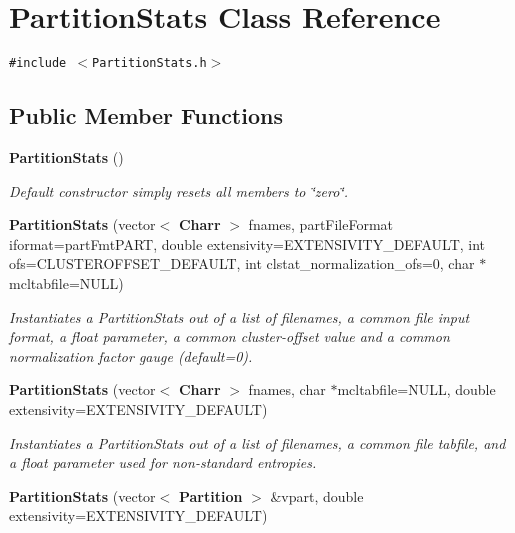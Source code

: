 \section{Partition\-Stats Class Reference}
\label{classPartitionStats}
{\tt \#include $<$Partition\-Stats.h$>$}

\subsection*{Public Member Functions}
\begin{CompactItemize}
\item 
{\bf Partition\-Stats} ()\label{classPartitionStats_a0}

\begin{CompactList}\small\item\em Default constructor simply resets all members to \char`\"{}zero\char`\"{}. \item\end{CompactList}\item 
{\bf Partition\-Stats} (vector$<$ {\bf Charr} $>$ fnames, part\-File\-Format iformat=part\-Fmt\-PART, double extensivity=EXTENSIVITY\_\-DEFAULT, int ofs=CLUSTEROFFSET\_\-DEFAULT, int clstat\_\-normalization\_\-ofs=0, char $\ast$mcltabfile=NULL)\label{classPartitionStats_a1}

\begin{CompactList}\small\item\em Instantiates a Partition\-Stats out of a list of filenames, a common file input format, a float parameter, a common cluster-offset value and a common normalization factor gauge (default=0). \item\end{CompactList}\item 
{\bf Partition\-Stats} (vector$<$ {\bf Charr} $>$ fnames, char $\ast$mcltabfile=NULL, double extensivity=EXTENSIVITY\_\-DEFAULT)\label{classPartitionStats_a2}

\begin{CompactList}\small\item\em Instantiates a Partition\-Stats out of a list of filenames, a common file tabfile, and a float parameter used for non-standard entropies. \item\end{CompactList}\item 
{\bf Partition\-Stats} (vector$<$ {\bf Partition} $>$ \&vpart, double extensivity=EXTENSIVITY\_\-DEFAULT)\label{classPartitionStats_a3}


\end{CompactItemize}
